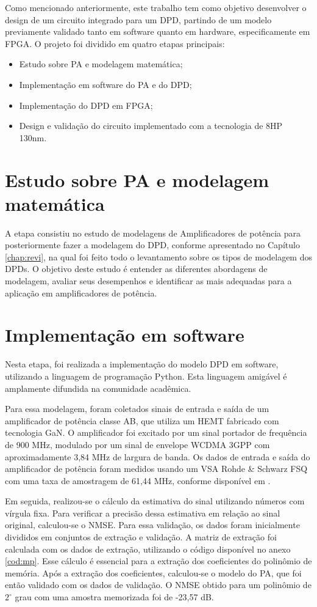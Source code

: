 Como mencionado anteriormente, este trabalho tem como objetivo desenvolver o design de um circuito integrado para um DPD, partindo de um modelo previamente validado tanto em software quanto em hardware, especificamente em FPGA. O projeto foi dividido em quatro etapas principais:

\begin{itemize}
\item Estudo sobre PA e modelagem matemática;
\item Implementação em software do PA e do DPD;
\item Implementação do DPD em FPGA;
\item Design e validação do circuito implementado com a tecnologia de 8HP 130nm.
\end{itemize}


\section{Estudo sobre PA e modelagem matemática}
A etapa consistiu no estudo de modelagens de Amplificadores de potência para posteriormente fazer a modelagem do DPD, conforme apresentado no Capítulo \ref{chap:revi}, na qual foi feito todo o levantamento sobre os tipos de modelagem dos DPDs. O objetivo deste estudo é entender as diferentes abordagens de modelagem, avaliar seus desempenhos e identificar as mais adequadas para a aplicação em amplificadores de potência.

\section{Implementação em software} \label{sec:implsoft}

Nesta etapa, foi realizada a implementação do modelo DPD em software, utilizando a linguagem de programação Python. Esta linguagem amigável é amplamente difundida na comunidade acadêmica.

Para essa modelagem, foram coletados sinais de entrada e saída de um amplificador de potência classe AB, que utiliza um HEMT fabricado com tecnologia GaN. O amplificador foi excitado por um sinal portador de frequência de 900 MHz, modulado por um sinal de envelope WCDMA 3GPP com aproximadamente 3,84 MHz de largura de banda. Os dados de entrada e saída do amplificador de potência foram medidos usando um VSA Rohde \& Schwarz FSQ com uma taxa de amostragem de 61,44 MHz, conforme disponível em \cite{Bonfim2016}.

Em seguida, realizou-se o cálculo da estimativa do sinal utilizando números com vírgula fixa. Para verificar a precisão dessa estimativa em relação ao sinal original, calculou-se o NMSE. Para essa validação, os dados foram inicialmente divididos em conjuntos de extração e validação. A matriz de extração foi calculada com os dados de extração, utilizando o código disponível no anexo \ref{cod:mp}. Esse cálculo é essencial para a extração dos coeficientes do polinômio de memória. Após a extração dos coeficientes, calculou-se o modelo do PA, que foi então validado com os dados de validação. O NMSE obtido para um polinômio de $2^\circ$ grau com uma amostra memorizada foi de -23,57 dB.

